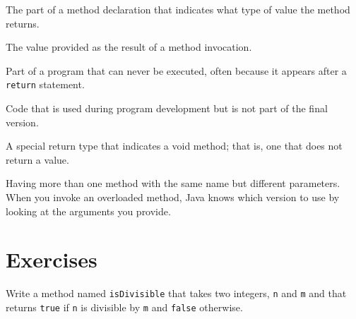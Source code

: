 \documentclass[12pt]{book}
\begin{document}
\begin{description}

The part of a method declaration that indicates what type of value the method returns.

The value provided as the result of a method invocation.

Part of a program that can never be executed, often because it appears after a {\tt return} statement.

Code that is used during program development but is not part of the final version.

A special return type that indicates a void method; that is, one that does not return a value.

Having more than one method with the same name but different parameters.
When you invoke an overloaded method, Java knows which version to use by looking at the arguments you provide.

\end{description}


\section{Exercises}

\begin{exercise}
\label{ex.isdiv}

Write a method named {\tt isDivisible} that takes two integers, {\tt n} and {\tt m} and that returns {\tt true} if {\tt n} is divisible by {\tt m} and {\tt false} otherwise.
\end{exercise}
\end{document}
